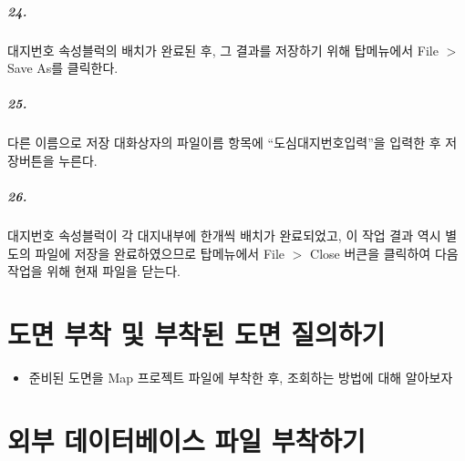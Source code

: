 \documentclass[12pt,a4paper,oneside]{book}
\begin{document}
	\paragraph {24.} 
	대지번호 속성블럭의 배치가 완료된 후, 그 결과를 저장하기 위해 탑메뉴에서 File $>$ Save As를 클릭한다.

	\paragraph {25.} 
	다른 이름으로 저장 대화상자의 파일이름 항목에 ``도심대지번호입력''을 입력한 후 저장버튼을 누른다.

	\paragraph {26.} 
	대지번호 속성블럭이 각 대지내부에 한개씩 배치가 완료되었고, 
	이 작업 결과 역시 별도의 파일에 저장을 완료하였으므로 
	탑메뉴에서 File $>$ Close 버큰을 클릭하여 다음 작업을 위해 현재 파일을 닫는다.






\newpage
\chapter{도면 부착 및 부착된 도면 질의하기}

	\newpage
	\begin{itemize}
	\item	준비된 도면을 Map 프로젝트 파일에 부착한 후, 조회하는 방법에 대해 알아보자

	\end{itemize}













	








\newpage
\chapter{외부 데이터베이스 파일 부착하기}




\newpage
\end{document}
